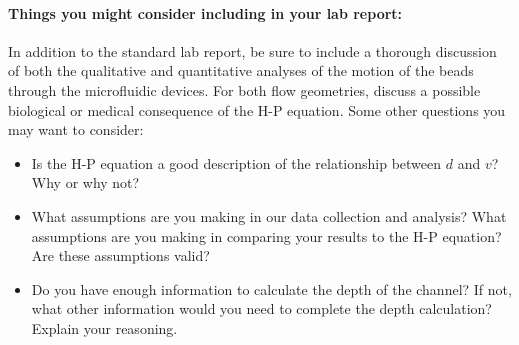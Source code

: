 \paragraph*{Things you might consider including in your lab report:} In addition to the standard lab report, be sure to include a thorough discussion of both the qualitative and quantitative analyses of the motion of the beads through the microfluidic devices.
For both flow geometries, discuss a possible biological or medical consequence of the H-P equation.
Some other questions you may want to consider:
\begin{itemize}
\item Is the H-P equation a good description of the relationship between $d$ and $v$? Why or why not?
\item What assumptions are you making in our data collection and analysis? What assumptions are you making in comparing your results to the H-P equation? Are these assumptions valid?
\item Do you have enough information to calculate the depth of the channel? If not, what other information would you need to complete the depth calculation? Explain your reasoning.
\end{itemize}